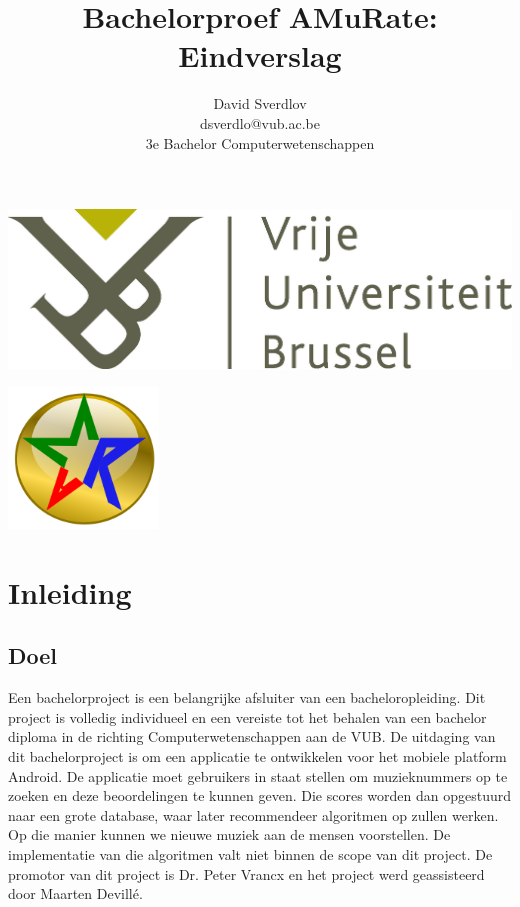 \documentclass[11pt,a4paper]{article}
\author{David Sverdlov \\ dsverdlo@vub.ac.be \\ 3e Bachelor Computerwetenschappen}
\title{Bachelorproef AMuRate: Eindverslag }
\begin{document}
\begin{flushleft}
\noindent \includegraphics[width=0.6\linewidth]{Pictures/vub_logo.jpg} 
\end{flushleft}
{\let\newpage\relax\maketitle} %

\begin{center}
\includegraphics[width=4cm]{Pictures/amr_gold_thick.png} 
\end{center}



\newpage
\tableofcontents

\newpage
\section{Inleiding} 
\label{sec:Inleiding}

	\subsection{Doel} 
	\label{sec:Doel}
Een bachelorproject is een belangrijke afsluiter van een bacheloropleiding. Dit project is volledig individueel en een vereiste tot het behalen van een bachelor diploma in de richting Computerwetenschappen aan de VUB. De uitdaging van dit bachelorproject is om een applicatie te ontwikkelen voor het mobiele platform Android. De applicatie moet gebruikers in staat stellen om muzieknummers op te zoeken en deze beoordelingen te kunnen geven. Die scores worden dan opgestuurd naar een grote database, waar later recommendeer algoritmen op zullen werken. Op die manier kunnen we nieuwe muziek aan de mensen voorstellen. De implementatie van die algoritmen valt niet binnen de scope van dit project. De promotor van dit project is Dr. Peter Vrancx en het project werd geassisteerd door Maarten Devillé.
\end{document}

